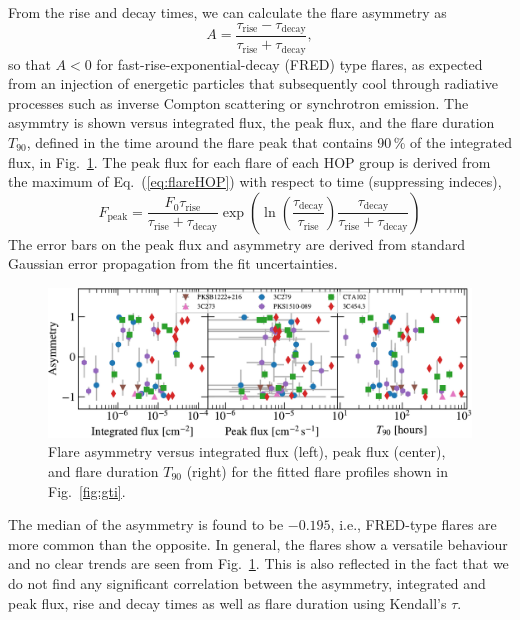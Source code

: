 \documentclass[twocolumn,linenumbers]{aastex62}
\begin{document}
From the rise and decay times, we can calculate the flare asymmetry as
\begin{equation}
    A = \frac{\tau_\mathrm{rise}-\tau_\mathrm{decay}}
    {\tau_\mathrm{rise}+\tau_\mathrm{decay}},
\end{equation}
so that $A < 0$ for fast-rise-exponential-decay (FRED) type flares, as expected from an injection of energetic particles that subsequently cool through radiative processes such as inverse Compton scattering or synchrotron emission.
The asymmtry is shown versus integrated flux, the peak flux, and the flare duration $T_{90}$, defined in the time around the flare peak that contains 90\,\% of the integrated flux, in Fig.~\ref{fig:asym}.
The peak flux for each flare of each HOP group is derived from the maximum of  Eq.~(\ref{eq:flareHOP}) with respect to time (suppressing indeces),
\begin{equation}
    F_{\mathrm{peak}} = \frac{F_{0} \tau_\mathrm{rise}}{\tau_\mathrm{rise} + \tau_\mathrm{decay}}\exp\left(\ln\left(\frac{\tau_\mathrm{decay}}{\tau_\mathrm{rise}}\right)\frac{\tau_\mathrm{decay}}{\tau_\mathrm{rise} + \tau_\mathrm{decay}}\right)
\end{equation}
The error bars on the peak flux and asymmetry are derived from standard Gaussian error propagation from the fit uncertainties.
\begin{figure}
    \centering
    \includegraphics[width = .8\linewidth]{figures/lcfithop_results_asym_vs_all_orbit_maxiter2_fsys0p00_addcomp0.pdf}
    \caption{Flare asymmetry versus integrated flux (left), peak flux (center), and flare duration $T_{90}$ (right) for the fitted flare profiles shown in Fig.~\ref{fig:gti}.}
    \label{fig:asym}
\end{figure}

The median of the asymmetry is found to be $-0.195$, i.e., FRED-type flares are more common than the opposite. In general, the flares show a versatile behaviour and no clear trends are seen from Fig.~\ref{fig:asym}. This is also reflected in the fact that we do not find any significant correlation between the asymmetry, integrated and peak flux, rise and decay times as well as flare duration using Kendall's $\tau$.
\end{document}
